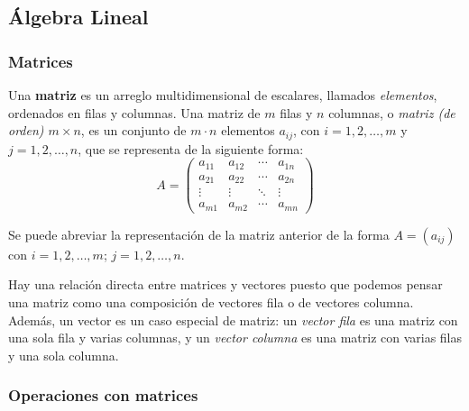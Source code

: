 \documentclass[12pt]{article}
\begin{document}
\subsection{Álgebra Lineal}

\subsubsection{Matrices}

Una \textbf{matriz} es un arreglo multidimensional de escalares, llamados \textit{elementos}, ordenados en filas y columnas.  Una matriz de $ m $ filas y $ n $ columnas, o \textit{matriz (de orden) $ m \times n $}, es un conjunto de $ m \cdot n $ elementos $ a_{ij} $, con $ i = 1, 2, \ldots, m $ y $ j = 1, 2, \ldots, n $, que se representa de la siguiente forma:
$$A = \begin{pmatrix}
a_{11} & a_{12} & \cdots & a_{1n} \\
a_{21} & a_{22} & \cdots & a_{2n} \\
\vdots & \vdots & \ddots & \vdots \\
a_{m1} & a_{m2} & \cdots & a_{mn}
\end{pmatrix}$$

Se puede abreviar la representación de la matriz anterior de la forma $ A = (a_{ij}) $ con $ i = 1, 2, \ldots, m $; $ j = 1, 2, \ldots, n $.

Hay una relación directa entre matrices y vectores puesto que podemos pensar una matriz como una composición de vectores fila o de vectores columna. Además, un vector es un caso especial de matriz: un \textit{vector fila} es una matriz con una sola fila y varias columnas, y un \textit{vector columna} es una matriz con varias filas y una sola columna. 

\subsubsection{Operaciones con matrices}
\end{document}
